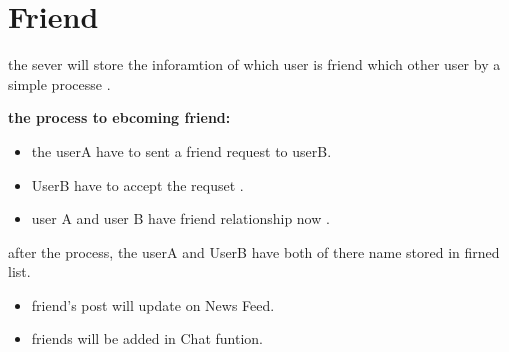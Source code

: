 \section {Friend}

the sever will store the inforamtion of which user is friend which other user by a simple processe .

\textbf{the process to ebcoming friend:}
\begin{itemize}
\item the userA have to sent a friend request to userB.
\item UserB have to accept the requset .
\item user A and user B have friend relationship now .
\end{itemize}


after the process, the userA and UserB have both of there name stored in firned list.
\begin{itemize}
\textbf{Funtion after become friend}
\item friend's post will update on News Feed.
\item friends will be added in Chat funtion.
\end{itemize}